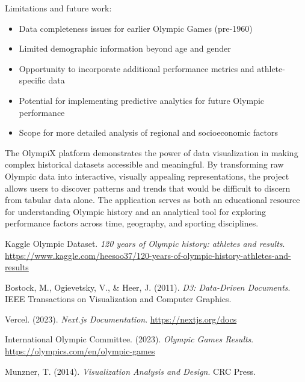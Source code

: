 \documentclass[a4paper, 12pt]{article}
\begin{document}
Limitations and future work:
\begin{itemize}[leftmargin=*]
    \item Data completeness issues for earlier Olympic Games (pre-1960)
    \item Limited demographic information beyond age and gender
    \item Opportunity to incorporate additional performance metrics and athlete-specific data
    \item Potential for implementing predictive analytics for future Olympic performance
    \item Scope for more detailed analysis of regional and socioeconomic factors
\end{itemize}

The OlympiX platform demonstrates the power of data visualization in making complex historical datasets accessible and meaningful. By transforming raw Olympic data into interactive, visually appealing representations, the project allows users to discover patterns and trends that would be difficult to discern from tabular data alone. The application serves as both an educational resource for understanding Olympic history and an analytical tool for exploring performance factors across time, geography, and sporting disciplines.

\begin{thebibliography}{9}
Kaggle Olympic Dataset. 
\textit{120 years of Olympic history: athletes and results}.
\url{https://www.kaggle.com/heesoo37/120-years-of-olympic-history-athletes-and-results}

Bostock, M., Ogievetsky, V., \& Heer, J. (2011). 
\textit{D3: Data-Driven Documents}. 
IEEE Transactions on Visualization and Computer Graphics.

Vercel. (2023).
\textit{Next.js Documentation}.
\url{https://nextjs.org/docs}

International Olympic Committee. (2023).
\textit{Olympic Games Results}.
\url{https://olympics.com/en/olympic-games}

Munzner, T. (2014). 
\textit{Visualization Analysis and Design}. 
CRC Press.
\end{thebibliography}
\end{document}
